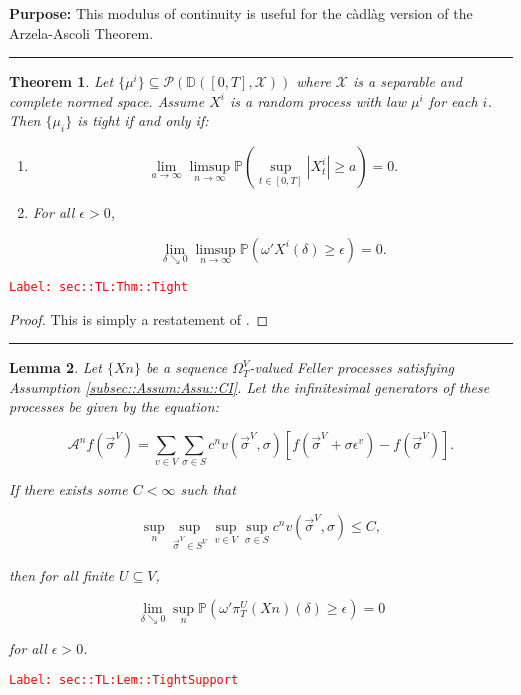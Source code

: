 \documentclass[12pt]{article}
\newcommand{\mb}{\mathbb}
\newcommand{\mc}{\mathcal}
\newcommand{\ra}{\rightarrow}
\newcommand{\ep}{\epsilon}
\newcommand{\tr}{\textcolor{red}}
\newcommand{\labe}[1]{\tr{\texttt{Label: #1}}}
\newcommand{\purpose}{\textbf{Purpose: }}
\newcommand{\lin}{\rule{\linewidth}{0.4 pt}}
\newcommand{\pr}{\mb{P}}							%
\newcommand{\cad}{\mb{D}}							%
\renewcommand{\v}{v}							%
\renewcommand{\U}{U}							%
\renewcommand{\S}{S}							%
\newcommand{\s}{\sigma}							%
\newcommand{\sv}{\vec{\s}}						%
\newcommand{\ev}{\ep}							%
\newcommand{\T}{T}								%
\renewcommand{\t}{t}							%
\newcommand{\sset}{\Omega}						%
\newcommand{\proj}{\pi}							%
\newcommand{\X}{X}								%
\newcommand{\IG}{\mc{A}}						%
\newcommand{\IGr}{c}							%
\newcommand{\vind}[1]{^{#1}}					%
\newcommand{\carp}[1]{^{#1}}					%
\newcommand{\vsi}[1]{^{#1}}						%
\newcommand{\cind}[1]{_{#1}}					%
\newcommand{\ts}[1]{_{#1}}						%
\newcommand{\const}{C}							%
\newcommand{\sln}[1]{^{#1}}						%
\newcommand{\cmodu}{\omega'}					%
\newcommand{\m}{\mu}							%
\newcommand{\spce}{\mc{X}}						%
\newtheorem{thms}{Theorem}[section]
\newtheorem{lem}[thms]{Lemma}
\begin{document}
\purpose This modulus of continuity is useful for the c\`adl\`ag version of the Arzela-Ascoli Theorem.

\lin

\begin{thms}
Let \(\{\m^i\}\subseteq \mc{P}\left(\cad([0,T],\spce)\right)\) where \(\spce\) is a separable and complete normed space. Assume \(\X^i\) is a random process with law \(\m^i\) for each \(i\). Then \(\{\m_i\}\) is tight if and only if:

\begin{enumerate}[(1)]
\item 

\[\lim_{a \ra \infty}\limsup_{n \ra\infty} \pr\left(\sup_{\t \in [0,T]} |\X^i_\t| \geq a\right) = 0.\]

\item For all \(\ep > 0\),

\[\lim_{\delta \searrow 0}\limsup_{n\ra\infty} \pr\left(\cmodu{\X^i}(\delta) \geq \ep\right) = 0.\]
\end{enumerate}
\label{sec::TL:Thm::Tight}
\end{thms}
\labe{sec::TL:Thm::Tight}

\begin{proof}
This is simply a restatement of \cite[Theorem 13.2]{Bil99}.
\end{proof}

\lin

\begin{lem}
Let \(\{\X{}{}{n}\}\) be a sequence \(\sset\vsi{V}\ts{\T}\)-valued Feller processes satisfying Assumption \ref{subsec::Assum:Assu::CI}. Let the infinitesimal generators of these processes be given by the equation:

\[\IG\sln{n}f(\sv\cind{}\vsi{V}) = \sum_{\v\in V}\sum_{\s \in \S} \IGr\sln{n}{\v}(\sv\cind{}\vsi{V},\s)[f(\sv\cind{}\vsi{V} + \s\ev\vind{\v}) - f(\sv\cind{}\vsi{V})].\]

If there exists some \(\const{} < \infty\) such that

\[\sup_{n}\sup_{\sv\cind{}\vsi{V}\in \S\carp{V}}\sup_{\v\in V}\sup_{\s\in \S} \IGr\sln{n}{\v}(\sv\cind{}\vsi{V},\s) \leq \const{},\]

then for all finite \(\U \subseteq V\),

\[\lim_{\delta \searrow 0} \sup_n \pr\left(\cmodu{\proj\vsi{\U}\ts{\T}\left(\X{}{}{n}\right)}(\delta) \geq \ep\right) = 0\]

for all \(\ep > 0\).
\label{sec::TL:Lem::TightSupport}
\end{lem}
\labe{sec::TL:Lem::TightSupport}
\end{document}
